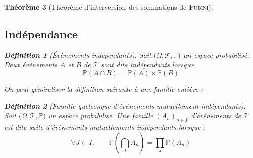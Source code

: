 \documentclass[11pt,a4paper]{report}
\newtheorem{theorem}{Théorème}[chapter]
\theoremstyle{definition}
\newtheorem{dfn}[theorem]{Définition}
\begin{document}
\begin{theorem}[Théorème d'interversion des sommations de \textsc{Fubini}]
{{\subsection{Indépendance} %
\label{sub:independance}
\begin{dfn}[Évènements indépendants]
     Soit $\big( \Omega , \mathscr{T}, \mathbb{P} \big)$ un espace probabilisé. \newline
     Deux évènements $A$ et $B$ de $\mathscr{T}$ sont dits \emph{indépendants} lorsque 
     \begin{equation}
     \mathbb{P}(A\cap B) = \mathbb{P}(A)\times \mathbb{P}(B)
     \end{equation}
\end{dfn}
On peut généraliser la définition suivante à une famille entière :
\begin{dfn}[Famille quelconque d'évènements mutuellement indépendants]
     Soit $\big( \Omega , \mathscr{T}, \mathbb{P} \big)$ un espace probabilisé. \newline
     Une famille $(A_n)_{n\in I}$  d'évènements de $\mathscr{T}$ est dite \emph{suite d'évènements mutuellements indépendants} lorsque :
     \begin{equation}
     \forall J\subset I,\qquad \mathbb{P} \left( \bigcap_J A_n \right) = \prod_J \mathbb{P} (A_n)
     \end{equation}
\end{dfn}


}}
\end{theorem}
\end{document}
